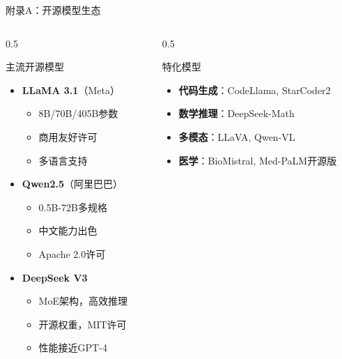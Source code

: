 \documentclass[aspectratio=169,11pt]{beamer}
\begin{document}
\begin{frame}{附录A：开源模型生态}
    \begin{columns}
        \begin{column}{0.5\textwidth}
            \begin{block}{主流开源模型}
                \small
                \begin{itemize}
                    \item \textbf{LLaMA 3.1}（Meta）
                    \begin{itemize}
                        \tiny
                        \item 8B/70B/405B参数
                        \item 商用友好许可
                        \item 多语言支持
                    \end{itemize}
                    \item \textbf{Qwen2.5}（阿里巴巴）
                    \begin{itemize}
                        \tiny
                        \item 0.5B-72B多规格
                        \item 中文能力出色
                        \item Apache 2.0许可
                    \end{itemize}
                    \item \textbf{DeepSeek V3}
                    \begin{itemize}
                        \tiny
                        \item MoE架构，高效推理
                        \item 开源权重，MIT许可
                        \item 性能接近GPT-4
                    \end{itemize}
                \end{itemize}
            \end{block}
        \end{column}
        \begin{column}{0.5\textwidth}
            \begin{block}{特化模型}
                \small
                \begin{itemize}
                    \item \textbf{代码生成}：CodeLlama, StarCoder2
                    \item \textbf{数学推理}：DeepSeek-Math
                    \item \textbf{多模态}：LLaVA, Qwen-VL
                    \item \textbf{医学}：BioMistral, Med-PaLM开源版
                \end{itemize}
            \end{block}
            

\end{column}
\end{columns}
\end{frame}
\end{document}
